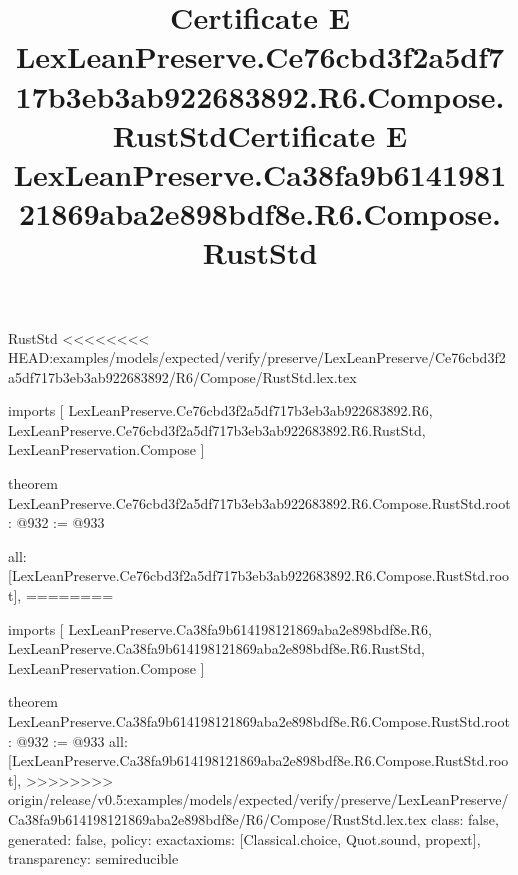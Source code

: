 \begin{lexlean}{RustStd}
<<<<<<<< HEAD:examples/models/expected/verify/preserve/LexLeanPreserve/Ce76cbd3f2a5df717b3eb3ab922683892/R6/Compose/RustStd.lex.tex
\title{Certificate E LexLeanPreserve.Ce76cbd3f2a5df717b3eb3ab922683892.R6.Compose.RustStd}
\begin{coremodule}
imports [
  LexLeanPreserve.Ce76cbd3f2a5df717b3eb3ab922683892.R6,
  LexLeanPreserve.Ce76cbd3f2a5df717b3eb3ab922683892.R6.RustStd,
  LexLeanPreservation.Compose
]

theorem LexLeanPreserve.Ce76cbd3f2a5df717b3eb3ab922683892.R6.Compose.RustStd.root : @932 := @933 {
  all: [LexLeanPreserve.Ce76cbd3f2a5df717b3eb3ab922683892.R6.Compose.RustStd.root],
========
\title{Certificate E LexLeanPreserve.Ca38fa9b614198121869aba2e898bdf8e.R6.Compose.RustStd}
\begin{coremodule}
imports [
  LexLeanPreserve.Ca38fa9b614198121869aba2e898bdf8e.R6,
  LexLeanPreserve.Ca38fa9b614198121869aba2e898bdf8e.R6.RustStd,
  LexLeanPreservation.Compose
]

theorem LexLeanPreserve.Ca38fa9b614198121869aba2e898bdf8e.R6.Compose.RustStd.root : @932 := @933 {
  all: [LexLeanPreserve.Ca38fa9b614198121869aba2e898bdf8e.R6.Compose.RustStd.root],
>>>>>>>> origin/release/v0.5:examples/models/expected/verify/preserve/LexLeanPreserve/Ca38fa9b614198121869aba2e898bdf8e/R6/Compose/RustStd.lex.tex
  class: false,
  generated: false,
  policy: exact{axioms: [Classical.choice, Quot.sound, propext]},
  transparency: semireducible
}


\end{coremodule}}
\end{coremodule}
\end{lexlean}
